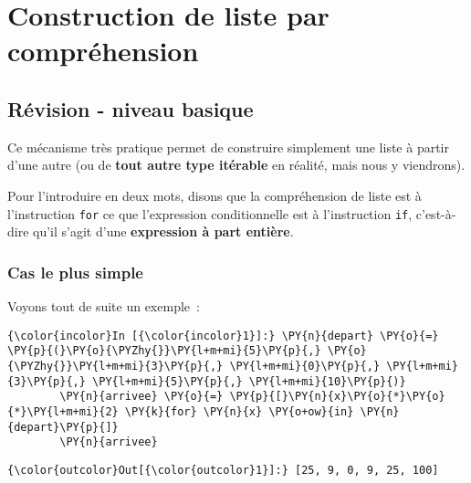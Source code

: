     
    
    
    

    

    \hypertarget{construction-de-liste-par-compruxe9hension}{%
\section{Construction de liste par
compréhension}\label{construction-de-liste-par-compruxe9hension}}

    \hypertarget{ruxe9vision---niveau-basique}{%
\subsection{Révision - niveau
basique}\label{ruxe9vision---niveau-basique}}

    Ce mécanisme très pratique permet de construire simplement une liste à
partir d'une autre (ou de \textbf{tout autre type itérable} en réalité,
mais nous y viendrons).

Pour l'introduire en deux mots, disons que la compréhension de liste est
à l'instruction \texttt{for} ce que l'expression conditionnelle est à
l'instruction \texttt{if}, c'est-à-dire qu'il s'agit d'une
\textbf{expression à part entière}.

    \hypertarget{cas-le-plus-simple}{%
\subsubsection{Cas le plus simple}\label{cas-le-plus-simple}}

    Voyons tout de suite un exemple~:

    \begin{Verbatim}[commandchars=\\\{\}]
{\color{incolor}In [{\color{incolor}1}]:} \PY{n}{depart} \PY{o}{=} \PY{p}{(}\PY{o}{\PYZhy{}}\PY{l+m+mi}{5}\PY{p}{,} \PY{o}{\PYZhy{}}\PY{l+m+mi}{3}\PY{p}{,} \PY{l+m+mi}{0}\PY{p}{,} \PY{l+m+mi}{3}\PY{p}{,} \PY{l+m+mi}{5}\PY{p}{,} \PY{l+m+mi}{10}\PY{p}{)}
        \PY{n}{arrivee} \PY{o}{=} \PY{p}{[}\PY{n}{x}\PY{o}{*}\PY{o}{*}\PY{l+m+mi}{2} \PY{k}{for} \PY{n}{x} \PY{o+ow}{in} \PY{n}{depart}\PY{p}{]}
        \PY{n}{arrivee}
\end{Verbatim}


\begin{Verbatim}[commandchars=\\\{\}]
{\color{outcolor}Out[{\color{outcolor}1}]:} [25, 9, 0, 9, 25, 100]
\end{Verbatim}
            
